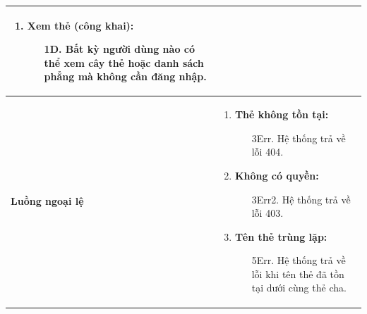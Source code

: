 {\begin{tabularx}{\textwidth}{|>{\raggedright\arraybackslash}p{3.5cm}|>{\raggedright\arraybackslash}X|}
\begin{enumerate}
\begin{enumerate}
    \end{enumerate}
    \item \textbf{Xem thẻ (công khai):}
    \begin{enumerate}
        \item[1D.] Bất kỳ người dùng nào có thể xem cây thẻ hoặc danh sách phẳng mà không cần đăng nhập.
    \end{enumerate}
\end{enumerate} \\
\hline
\textbf{Luồng ngoại lệ} &
\begin{enumerate}
    \item \textbf{Thẻ không tồn tại:}
    \begin{enumerate}
        \item[3Err.] Hệ thống trả về lỗi 404.
    \end{enumerate}
    \item \textbf{Không có quyền:}
    \begin{enumerate}
        \item[3Err2.] Hệ thống trả về lỗi 403.
    \end{enumerate}
    \item \textbf{Tên thẻ trùng lặp:}
    \begin{enumerate}
        \item[5Err.] Hệ thống trả về lỗi khi tên thẻ đã tồn tại dưới cùng thẻ cha.
    \end{enumerate}
\end{enumerate} \\
\hline
\end{tabularx}
}

